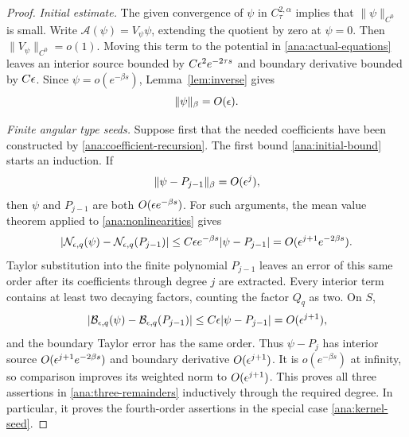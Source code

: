 \begin{proof}
\emph{Initial estimate.}
The given convergence of $\psi$ in $C^{2,\alpha}_\tau$ implies that
$\|\psi\|_{C^0}$ is small.  Write
$\mathcal A(\psi)=V_\psi\psi$, extending the quotient by zero at
$\psi=0$.  Then $\|V_\psi\|_{C^0}=o(1)$.  Moving this term to the
potential in \eqref{ana:actual-equations} leaves an interior source
bounded by $C\epsilon^2e^{-2\tau s}$ and boundary derivative bounded
by $C\epsilon$.  Since $\psi=o(e^{-\beta s})$, Lemma~\ref{lem:inverse}
gives
\begin{equation}
 \|\psi\|_\beta=O(\epsilon).
 \label{ana:initial-bound}
\end{equation}

\emph{Finite angular type seeds.}
Suppose first that the needed coefficients have been constructed
by \eqref{ana:coefficient-recursion}.  The first bound
\eqref{ana:initial-bound} starts an induction.  If
\[
 \|\psi-P_{j-1}\|_\beta=O(\epsilon^j),
\]
then $\psi$ and $P_{j-1}$ are both $O(\epsilon e^{-\beta s})$.
For such arguments, the mean value theorem applied to
\eqref{ana:nonlinearities} gives
\[
 |\mathcal N_{\epsilon,q}(\psi)
       -\mathcal N_{\epsilon,q}(P_{j-1})|
 \leq C\epsilon e^{-\beta s}|\psi-P_{j-1}|
 =O(\epsilon^{j+1}e^{-2\beta s}).
\]
Taylor substitution into the finite polynomial $P_{j-1}$ leaves
an error of this same order after its coefficients through degree $j$
are extracted.  Every interior term contains at least two decaying
factors, counting the factor $Q_q$ as two.  On $S$,
\[
 |\mathcal B_{\epsilon,q}(\psi)
       -\mathcal B_{\epsilon,q}(P_{j-1})|
 \leq C\epsilon|\psi-P_{j-1}|=O(\epsilon^{j+1}),
\]
and the boundary Taylor error has the same order.  Thus
$\psi-P_j$ has interior source
$O(\epsilon^{j+1}e^{-2\beta s})$ and boundary derivative
$O(\epsilon^{j+1})$.  It is $o(e^{-\beta s})$ at infinity, so comparison
improves its weighted norm to $O(\epsilon^{j+1})$.
This proves all three assertions in \eqref{ana:three-remainders}
inductively through the required degree.  In particular, it proves
the fourth-order assertions in the special case
\eqref{ana:kernel-seed}.


\end{proof}
